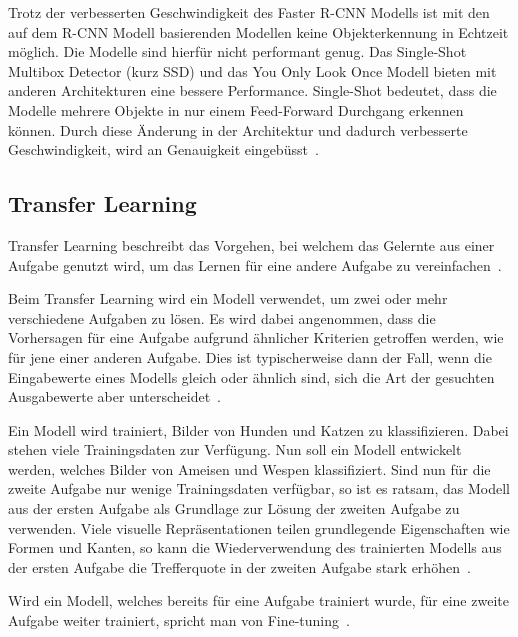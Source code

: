 Trotz der verbesserten Geschwindigkeit des Faster R-CNN Modells ist mit den auf dem R-CNN Modell basierenden Modellen keine Objekterkennung in Echtzeit möglich. Die Modelle sind hierfür nicht performant genug. Das Single-Shot Multibox Detector (kurz SSD) und das You Only Look Once Modell bieten mit anderen Architekturen eine bessere Performance. Single-Shot bedeutet, dass die Modelle mehrere Objekte in nur einem Feed-Forward Durchgang erkennen können. Durch diese Änderung in der Architektur und dadurch verbesserte Geschwindigkeit, wird an Genauigkeit eingebüsst~\autocite{SSD}.

\subsection{Transfer Learning}
\label{chap:transfer-learning}

Transfer Learning beschreibt das Vorgehen, bei welchem das Gelernte aus einer Aufgabe genutzt wird, um das Lernen für eine andere Aufgabe zu vereinfachen~\autocite{Goodfellow2016}.

Beim Transfer Learning wird ein Modell verwendet, um zwei oder mehr verschiedene Aufgaben zu lösen. Es wird dabei angenommen, dass die Vorhersagen für eine Aufgabe aufgrund ähnlicher Kriterien getroffen werden, wie für jene einer anderen Aufgabe. Dies ist typischerweise dann der Fall, wenn die Eingabewerte eines Modells gleich oder ähnlich sind, sich die Art der gesuchten Ausgabewerte aber unterscheidet~\autocite{Goodfellow2016}.

Ein Modell wird trainiert, Bilder von Hunden und Katzen zu klassifizieren. Dabei stehen viele Trainingsdaten zur Verfügung. Nun soll ein Modell entwickelt werden, welches Bilder von Ameisen und Wespen klassifiziert. Sind nun für die zweite Aufgabe nur wenige Trainingsdaten verfügbar, so ist es ratsam, das Modell aus der ersten Aufgabe als Grundlage zur Lösung der zweiten Aufgabe zu verwenden. Viele visuelle Repräsentationen teilen grundlegende Eigenschaften wie Formen und Kanten, so kann die Wiederverwendung des trainierten Modells aus der ersten Aufgabe die Trefferquote in der zweiten Aufgabe stark erhöhen~\autocite{Goodfellow2016}.

Wird ein Modell, welches bereits für eine Aufgabe trainiert wurde, für eine zweite Aufgabe weiter trainiert, spricht man von Fine-tuning~\autocite{Goodfellow2016}.


